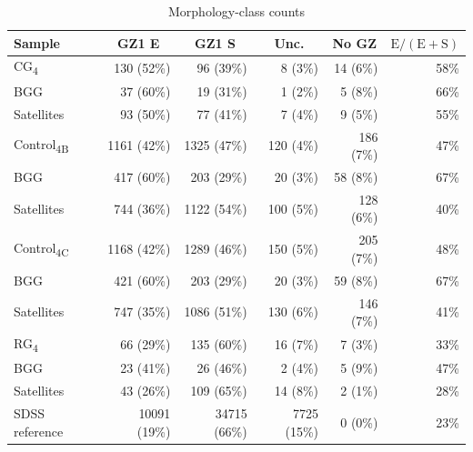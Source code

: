\documentclass{aa}
\newcommand{\CB}{Control\textsubscript{4B}}
\newcommand{\CC}{Control\textsubscript{4C}}
\newcommand{\CG}{CG\textsubscript{4}}
\newcommand{\RG}{RG\textsubscript{4}}
\begin{document}
\begin{table}
    \centering
    \caption{Morphology-class counts}
    \label{tab:morphologies}
    \begin{tabular}{lrrrrr}
        \hline\hline
            Sample & \multicolumn{1}{c}{GZ1 E} & \multicolumn{1}{c}{GZ1 S} & \multicolumn{1}{c}{Unc.} & \multicolumn{1}{c}{No GZ} & \multicolumn{1}{c}{\(\mathrm{E}/(\mathrm{E}+\mathrm{S})\)} \\
            \hline



            \addlinespace[2pt]
            \CG & 130 (52\%) & 96 (39\%) & 8 (3\%) & 14 (6\%) & 58\% \\
             \quad BGG & 37 (60\%) & 19 (31\%) & 1 (2\%) & 5 (8\%) & 66\% \\
             \quad Satellites & 93 (50\%) & 77 (41\%) & 7 (4\%) & 9 (5\%) & 55\% \\

            \addlinespace[2pt]
            \CB & 1161 (42\%) & 1325 (47\%) & 120 (4\%) & 186 (7\%) & 47\% \\
             \quad BGG & 417 (60\%) & 203 (29\%) & 20 (3\%) & 58 (8\%) & 67\% \\
             \quad Satellites & 744 (36\%) & 1122 (54\%) & 100 (5\%) & 128 (6\%) & 40\% \\

            \addlinespace[2pt]
            \CC & 1168 (42\%) & 1289 (46\%) & 150 (5\%) & 205 (7\%) & 48\% \\
             \quad BGG & 421 (60\%) & 203 (29\%) & 20 (3\%) & 59 (8\%) & 67\% \\
             \quad Satellites & 747 (35\%) & 1086 (51\%) & 130 (6\%) & 146 (7\%) & 41\% \\

            \addlinespace[2pt]
            \RG & 66 (29\%) & 135 (60\%) & 16 (7\%) & 7 (3\%) & 33\% \\
             \quad BGG & 23 (41\%) & 26 (46\%) & 2 (4\%) & 5 (9\%) & 47\% \\
             \quad Satellites & 43 (26\%) & 109 (65\%) & 14 (8\%) & 2 (1\%) & 28\% \\

         \hline
            SDSS reference & 10091 (19\%) & 34715 (66\%) & 7725 (15\%) & 0 (0\%) & 23\% \\


\end{tabular}
\end{table}
\end{document}
